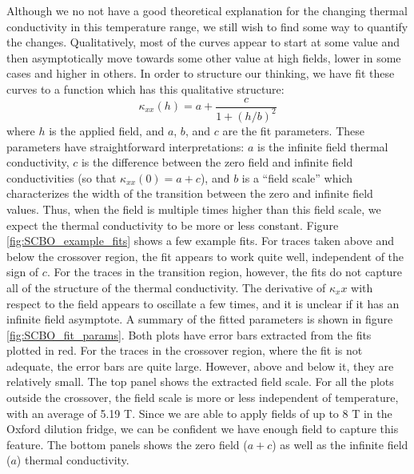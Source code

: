 \documentclass{thesis-umich}
\begin{document}
Although we no not have a good theoretical explanation for the changing thermal conductivity in this temperature range, we still wish to find some way to quantify the changes. Qualitatively, most of the curves appear to start at some value and then asymptotically move towards some other value at high fields, lower in some cases and higher in others. In order to structure our thinking, we have fit these curves to a function which has this qualitative structure:
\[ \kappa_{xx}(h) = a + \frac{c}{1 + (h/b)^2}\]
where $h$ is the applied field, and $a$, $b$, and $c$ are the fit parameters. These parameters have straightforward interpretations: $a$ is the infinite field thermal conductivity, $c$ is the difference between the zero field and infinite field conductivities (so that $\kappa_{xx}(0) = a + c$), and $b$ is a ``field scale'' which characterizes the width of the transition between the zero and infinite field values. Thus, when the field is multiple times higher than this field scale, we expect the thermal conductivity to be more or less constant. Figure \ref{fig:SCBO_example_fits} shows a few example fits. For traces taken above and below the crossover region, the fit appears to work quite well, independent of the sign of $c$. For the traces in the transition region, however, the fits do not capture all of the structure of the thermal conductivity. The derivative of $\kappa_xx$ with respect to the field appears to oscillate a few times, and it is unclear if it has an infinite field asymptote. A summary of the fitted parameters is shown in figure \ref{fig:SCBO_fit_params}. Both plots have error bars extracted from the fits plotted in red. For the traces in the crossover region, where the fit is not adequate, the error bars are quite large. However, above and below it, they are relatively small. The top panel shows the extracted field scale. For all the plots outside the crossover, the field scale is more or less independent of temperature, with an average of 5.19 T. Since we are able to apply fields of up to 8 T in the Oxford dilution fridge, we can be confident we have enough field to capture this feature. The bottom panels shows the zero field ($a + c$) as well as the infinite field ($a$) thermal conductivity. 
\end{document}
